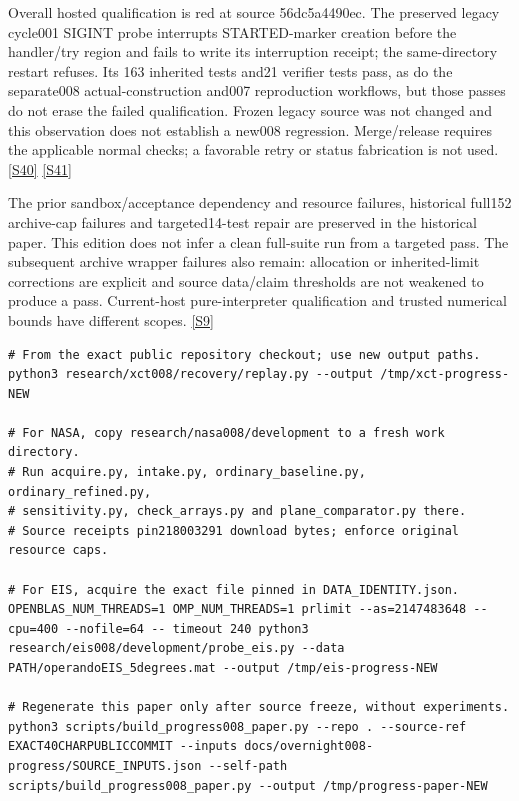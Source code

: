 \documentclass[11pt,letterpaper]{article}
\begin{document}
Overall hosted qualification is red at source 56dc5a4490ec. The preserved legacy cycle001 SIGINT probe interrupts STARTED-marker creation before the handler/try region and fails to write its interruption receipt; the same-directory restart refuses. Its 163 inherited tests and21 verifier tests pass, as do the separate008 actual-construction and007 reproduction workflows, but those passes do not erase the failed qualification. Frozen legacy source was not changed and this observation does not establish a new008 regression. Merge/release requires the applicable normal checks; a favorable retry or status fabrication is not used. \href{https://github.com/MontrealAI/AGI-Alpha-Invention-Flywheel-Lab/blob/2b7a58e6e6593ae48da6f7f33865db94868c957f/evidence/overnight-008/legacy-ci-failure-56dc/FAILURE.json}{[S40]} \href{https://github.com/MontrealAI/AGI-Alpha-Invention-Flywheel-Lab/blob/2b7a58e6e6593ae48da6f7f33865db94868c957f/evidence/overnight-008/legacy-ci-failure-56dc/interruption.json}{[S41]}\par
The prior sandbox/acceptance dependency and resource failures, historical full152 archive-cap failures and targeted14-test repair are preserved in the historical paper. This edition does not infer a clean full-suite run from a targeted pass. The subsequent archive wrapper failures also remain: allocation or inherited-limit corrections are explicit and source data/claim thresholds are not weakened to produce a pass. Current-host pure-interpreter qualification and trusted numerical bounds have different scopes. \href{https://github.com/MontrealAI/AGI-Alpha-Invention-Flywheel-Lab/blob/2b7a58e6e6593ae48da6f7f33865db94868c957f/evidence/overnight-008/xct-recovery/sandbox-current-host-bound/artifacts/REPORT.json}{[S9]}\par
\begin{lstlisting}
# From the exact public repository checkout; use new output paths.
python3 research/xct008/recovery/replay.py --output /tmp/xct-progress-NEW

# For NASA, copy research/nasa008/development to a fresh work directory.
# Run acquire.py, intake.py, ordinary_baseline.py, ordinary_refined.py,
# sensitivity.py, check_arrays.py and plane_comparator.py there.
# Source receipts pin218003291 download bytes; enforce original resource caps.

# For EIS, acquire the exact file pinned in DATA_IDENTITY.json.
OPENBLAS_NUM_THREADS=1 OMP_NUM_THREADS=1 prlimit --as=2147483648 --cpu=400 --nofile=64 -- timeout 240 python3 research/eis008/development/probe_eis.py --data PATH/operandoEIS_5degrees.mat --output /tmp/eis-progress-NEW

# Regenerate this paper only after source freeze, without experiments.
python3 scripts/build_progress008_paper.py --repo . --source-ref EXACT40CHARPUBLICCOMMIT --inputs docs/overnight008-progress/SOURCE_INPUTS.json --self-path scripts/build_progress008_paper.py --output /tmp/progress-paper-NEW
\end{lstlisting}
\end{document}
